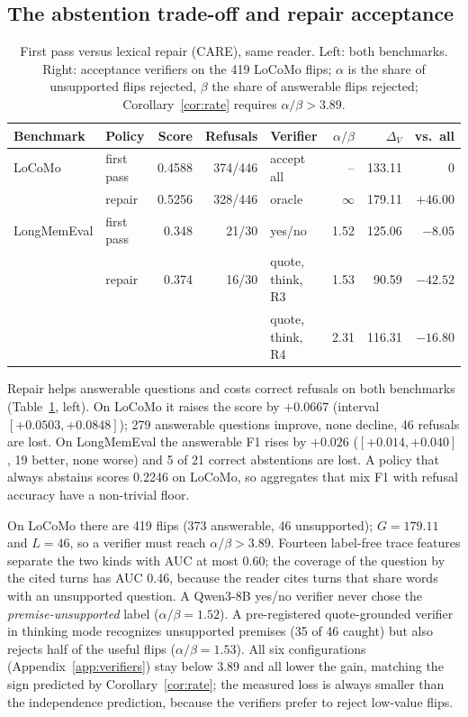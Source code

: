 \documentclass[10pt]{article}
\theoremstyle{plain}
\theoremstyle{definition}
\newcommand{\care}{\textsc{CARE}}
\begin{document}
\subsection{The abstention trade-off and repair acceptance}
\label{sec:abstention}

\begin{table}[t]
\centering
\caption{First pass versus lexical repair (\care{}), same reader. Left: both benchmarks. Right: acceptance
verifiers on the 419 LoCoMo flips; $\alpha$ is the share of unsupported flips rejected, $\beta$ the share
of answerable flips rejected; Corollary~\ref{cor:rate} requires $\alpha/\beta>3.89$.}
\label{tab:abstention}
\small
\begin{tabular}{llrr@{\hspace{14pt}}lrrr}
\toprule
Benchmark & Policy & Score & Refusals & Verifier & $\alpha/\beta$ & $\Delta_V$ & vs.\ all \\
\midrule
LoCoMo & first pass & 0.4588 & 374/446 & accept all & -- & 133.11 & 0 \\
       & repair & 0.5256 & 328/446 & oracle & $\infty$ & 179.11 & $+46.00$ \\
LongMemEval & first pass & 0.348 & 21/30 & yes/no & 1.52 & 125.06 & $-8.05$ \\
            & repair & 0.374 & 16/30 & quote, think, R3 & 1.53 & 90.59 & $-42.52$ \\
 & & & & quote, think, R4 & 2.31 & 116.31 & $-16.80$ \\
\bottomrule
\end{tabular}
\end{table}

Repair helps answerable questions and costs correct refusals on both benchmarks (Table~\ref{tab:abstention},
left). On LoCoMo it raises the score by $+0.0667$ (interval $[+0.0503,+0.0848]$); 279 answerable questions
improve, none decline, 46 refusals are lost. On LongMemEval the answerable F1 rises by $+0.026$
($[+0.014,+0.040]$, 19 better, none worse) and 5 of 21 correct abstentions are lost. A policy that always
abstains scores 0.2246 on LoCoMo, so aggregates that mix F1 with refusal accuracy have a non-trivial floor.

On LoCoMo there are 419 flips (373 answerable, 46 unsupported); $G=179.11$ and $L=46$, so a verifier must
reach $\alpha/\beta>3.89$. Fourteen label-free trace features separate the two kinds with AUC at most
0.60; the coverage of the question by the cited turns has AUC 0.46, because the reader cites turns that
share words with an unsupported question. A Qwen3-8B yes/no verifier never chose the
\emph{premise-unsupported} label ($\alpha/\beta=1.52$). A pre-registered quote-grounded verifier in
thinking mode recognizes unsupported premises (35 of 46 caught) but also rejects half of the useful flips
($\alpha/\beta=1.53$). All six configurations (Appendix~\ref{app:verifiers}) stay below 3.89 and all lower
the gain, matching the sign predicted by Corollary~\ref{cor:rate}; the measured loss is always smaller
than the independence prediction, because the verifiers prefer to reject low-value flips.
\end{document}
